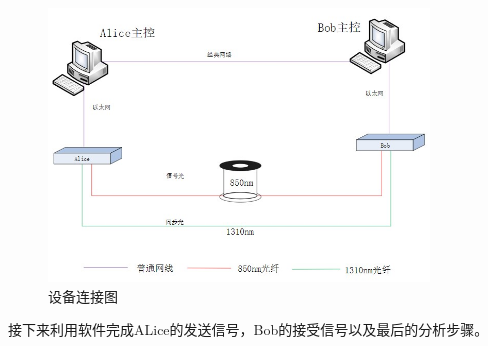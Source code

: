 \documentclass[a4paper,UTF8]{ctexart}
\begin{document}
\begin{figure}[H]
    \centering
    \begin{minipage}[b]{0.9\textwidth}
        \centering
        \includegraphics[width=0.9\textwidth]{./fig2.jpg}
        \caption{设备连接图}
    \end{minipage}
\end{figure}

接下来利用软件完成ALice的发送信号，Bob的接受信号以及最后的分析步骤。
\end{document}
